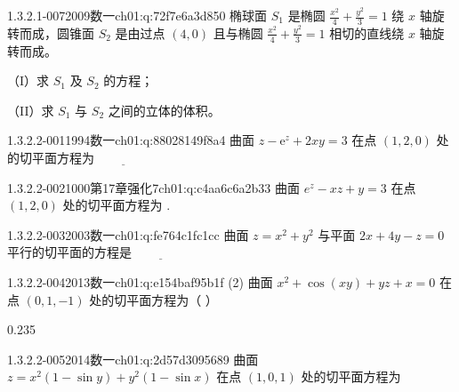 \begin{q}{1.3.2.1-007}{2009数一}{ch01:q:72f7e6a3d850}
椭球面 $S_1$ 是椭圆 $\frac{x^2}{4}+\frac{y^2}{3}=1$ 绕 $x$ 轴旋转而成，圆锥面 $S_2$ 是由过点 $(4,0)$ 且与椭圆 $\frac{x^2}{4}+\frac{y^2}{3}=1$ 相切的直线绕 $x$ 轴旋转而成。

（I）求 $S_1$ 及 $S_2$ 的方程；

（II）求 $S_1$ 与 $S_2$ 之间的立体的体积。
\end{q}

\par\addvspace{2.4ex}\noindent
\begin{minipage}{\linewidth}

\begin{q}{1.3.2.2-001}{1994数一}{ch01:q:88028149f8a4}
曲面 $z-\mathrm{e}^z+2xy=3$ 在点 $(1,2,0)$ 处的切平面方程为 $\underline{\hspace{4em}}$
\end{q}
\end{minipage}


\begin{q}{1.3.2.2-002}{1000第17章强化7}{ch01:q:c4aa6c6a2b33}
曲面 $e^z-xz+y=3$ 在点 $(1,2,0)$ 处的切平面方程为 \underline{\hspace{4em}}.
\end{q}

\begin{q}{1.3.2.2-003}{2003数一}{ch01:q:fe764c1fc1cc}
曲面 $z=x^{2}+y^{2}$ 与平面 $2x+4y-z=0$ 平行的切平面的方程是 $\underline{\hspace{4em}}$
\end{q}

\begin{q}{1.3.2.2-004}{2013数一}{ch01:q:e154baf95b1f}
(2) 曲面 $x^2+\cos(xy)+yz+x=0$ 在点 $(0,1,-1)$ 处的切平面方程为（ ）
\begin{opts}{0.235}
\hfill{}\hfill{}\hfill{}
\end{opts}
\end{q}

\begin{q}{1.3.2.2-005}{2014数一}{ch01:q:2d57d3095689}
曲面 $z=x^2(1-\sin y)+y^2(1-\sin x)$ 在点 $(1,0,1)$ 处的切平面方程为 \underline{\hspace{4em}}
\end{q}

